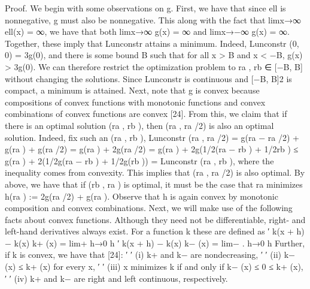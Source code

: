 \documentclass[10pt]{article}
\begin{document}
\begin{ReviewVerbatim}
Proof. We begin with some observations on g. First, we have that since ell is nonnegative, g must also
be nonnegative. This along with the fact that limx→∞ ell(x) = ∞, we have that both limx→∞ g(x) =
∞ and limx→−∞ g(x) = ∞. Together, these imply that Lunconstr attains a minimum. Indeed,
Lunconstr (0, 0) = 3g(0), and there is some bound B such that for all x > B and x < −B,
g(x) > 3g(0). We can therefore restrict the optimization problem to ra , rb ∈ [−B, B] without
changing the solutions. Since Lunconstr is continuous and [−B, B]2 is compact, a minimum is
attained.
Next, note that g is convex because compositions of convex functions with monotonic functions and
convex combinations of convex functions are convex [24]. From this, we claim that if there is an
optimal solution (ra , rb ), then (ra , ra /2) is also an optimal solution. Indeed, fix such an (ra , rb ),
                    Lunconstr (ra , ra /2) = g(ra − ra /2) + g(ra ) + g(ra /2)
                                           = g(ra ) + 2g(ra /2)
                                           = g(ra ) + 2g(1/2(ra − rb ) + 1/2rb )
                                           ≤ g(ra ) + 2(1/2g(ra − rb ) + 1/2g(rb ))
                                          = Lunconstr (ra , rb ),
where the inequality comes from convexity. This implies that (ra , ra /2) is also optimal.
By above, we have that if (rb , ra ) is optimal, it must be the case that ra minimizes
                                      h(ra ) := 2g(ra /2) + g(ra ).
Observe that h is again convex by monotonic composition and convex combinations.
Next, we will make use of the following facts about convex functions. Although they need not be
differentiable, right- and left-hand derivatives always exist. For a function k these are defined as
                                    ′            k(x + h) − k(x)
                                   k+ (x) = lim+
                                              h→0       h
                                    ′            k(x + h) − k(x)
                                   k− (x) = lim−                 .
                                           h→0          h
Further, if k is convex, we have that [24]:
                          ′      ′
                     (i) k+ and k− are nondecreasing,
                             ′        ′
                     (ii)   k− (x) ≤ k+ (x) for every x,
                                                         ′            ′
                     (iii) x minimizes k if and only if k− (x) ≤ 0 ≤ k+ (x),
                           ′      ′
                     (iv) k+ and k− are right and left continuous, respectively.


\end{ReviewVerbatim}
\end{document}
